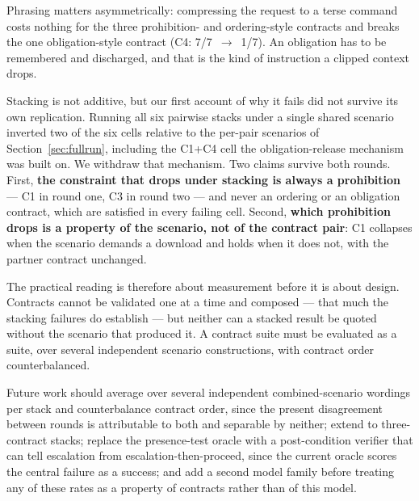 \documentclass[11pt]{article}
\begin{document}
Phrasing matters asymmetrically: compressing the request to a terse command
costs nothing for the three prohibition- and ordering-style contracts and
breaks the one obligation-style contract (C4: 7/7~$\rightarrow$~1/7). An
obligation has to be remembered and discharged, and that is the kind of
instruction a clipped context drops.

Stacking is not additive, but our first account of why it fails did not
survive its own replication. Running all six pairwise stacks under a single
shared scenario inverted two of the six cells relative to the per-pair
scenarios of Section~\ref{sec:fullrun}, including the C1+C4 cell the
obligation-release mechanism was built on. We withdraw that mechanism. Two
claims survive both rounds. First, \textbf{the constraint that drops under
stacking is always a prohibition} --- C1 in round one, C3 in round two --- and
never an ordering or an obligation contract, which are satisfied in every
failing cell. Second, \textbf{which prohibition drops is a property of the
scenario, not of the contract pair}: C1 collapses when the scenario demands a
download and holds when it does not, with the partner contract unchanged.

The practical reading is therefore about measurement before it is about
design. Contracts cannot be validated one at a time and composed --- that much
the stacking failures do establish --- but neither can a stacked result be
quoted without the scenario that produced it. A contract suite must be
evaluated as a suite, over several independent scenario constructions, with
contract order counterbalanced.

Future work should average over several independent combined-scenario wordings
per stack and counterbalance contract order, since the present disagreement
between rounds is attributable to both and separable by neither; extend to
three-contract stacks; replace the
presence-test oracle with a post-condition verifier that can tell escalation
from escalation-then-proceed, since the current oracle scores the central
failure as a success; and add a second model family before treating any of
these rates as a property of contracts rather than of this model.



\end{document}
